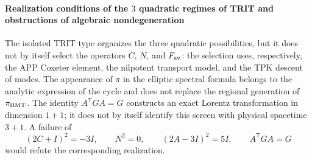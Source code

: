\paragraph{Realization conditions of the \(3\) quadratic regimes of TRIT and obstructions of algebraic nondegeneration}
The isolated TRIT type organizes the three quadratic possibilities, but it does not
by itself select the operators \(C\), \(N\), and \(F_{\rm av}\): the
selection uses, respectively, the APP Coxeter element, the nilpotent
transport model, and the TPK descent of modes. The appearance of \(\pi\) in the
elliptic spectral formula belongs to the analytic expression of the cycle and
does not replace the regional generation of \(\pi_{\rm HMT}\). The identity
\(A^{\mathsf T}GA=G\) constructs an exact Lorentz transformation in
dimension \(1+1\); it does not by itself identify this screen with
physical spacetime \(3+1\). A failure of
\[
(2C+I)^2=-3I,\qquad N^2=0,\qquad
(2A-3I)^2=5I,\qquad A^{\mathsf T}GA=G
\]
would refute the corresponding realization.
